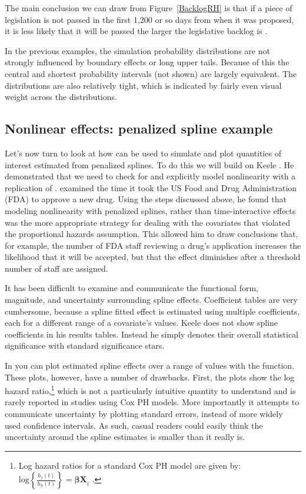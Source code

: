\documentclass[nojss]{jss}\usepackage[]{graphicx}\usepackage[]{color}
\begin{document}
The main conclusion we can draw from Figure~\ref{BacklogRH} is that if a piece of legislation is not passed in the first 1,200 or so days from when it was proposed, it is less likely that it will be passed the larger the legislative backlog is \cite[for more details see][p. 236-237]{Licht2011}.

In the previous examples, the simulation probability distributions are not strongly influenced by boundary effects or long upper tails. Because of this the central and shortest probability intervals (not shown) are largely equivalent. The distributions are also relatively tight, which is indicated by fairly even visual weight across the distributions.

\subsection{Nonlinear effects: penalized spline example}

Let's now turn to look at how  can be used to simulate and plot quantities of interest estimated from penalized splines. To do this we will build on Keele \citeyearpar{Keele2010}. He demonstrated that we need to check for and explicitly model nonlinearity with a replication of \cite{Carpenter2002}. \cite{Carpenter2002} examined the time it took the US Food and Drug Administration (FDA) to approve a new drug. Using the steps discussed above, he found that modeling nonlinearity with penalized splines, rather than time-interactive effects was the more appropriate strategy for dealing with the covariates that violated the proportional hazards assumption. This allowed him to draw conclusions that, for example, the number of FDA staff reviewing a drug's application increases the likelihood that it will be accepted, but that the effect diminishes after a threshold number of staff are assigned.

It has been difficult to examine and communicate the functional form, magnitude, and uncertainty surrounding spline effects. Coefficient tables are very cumbersome, because a spline fitted effect is estimated using multiple coefficients, each for a different range of a covariate's values. Keele does not show spline coefficients in his results tables. Instead he simply denotes their overall statistical significance with standard significance stars.

In  you can plot estimated spline effects over a range of values with the  function. These plots, however, have a number of drawbacks. First, the plots show the log hazard ratio,\footnote{Log hazard ratios for a standard Cox PH model are given by: $\mathrm{log} \left\{\frac{h_{j}(t)}{h_{h}(t)}\right\} = \mathbf{\beta X}_{i}$ \cite[modified from][49]{boxsteffensmeier2004}.} which is not a particularly intuitive quantity to understand and is rarely reported in studies using Cox PH models. More importantly it attempts to communicate uncertainty by plotting standard errors, instead of more widely used confidence intervals. As such, casual readers could easily think the uncertainty around the spline estimates is smaller than it really is.
\end{document}
